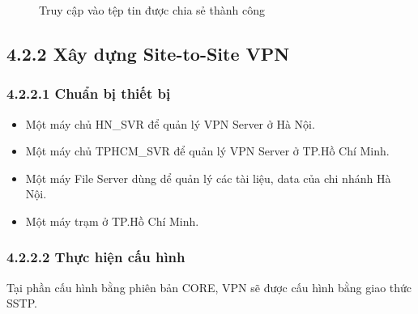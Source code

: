 \begin{itemize}
\begin{figure}[htbp]
            \hfill
            \caption{Truy cập vào tệp tin được chia sẻ thành công}
        \end{figure}
    \newpage
\end{itemize}


 \subsection*{4.2.2 Xây dựng Site-to-Site VPN}

\subsubsection*{4.2.2.1 Chuẩn bị thiết bị}
\begin{itemize}
     \item Một máy chủ HN\_SVR để quản lý VPN Server ở Hà Nội.
     \item Một máy chủ TPHCM\_SVR để quản lý  VPN Server ở TP.Hồ Chí Minh.
     \item Một máy File Server dùng dể quản lý các tài liệu, data của chi nhánh Hà Nội.
     \item Một máy trạm ở TP.Hồ Chí Minh.
 \end{itemize}
 \subsubsection*{4.2.2.2 Thực hiện cấu hình}
 
Tại phần cấu hình bằng phiên bản CORE, VPN sẽ được cấu hình bằng giao thức SSTP.


